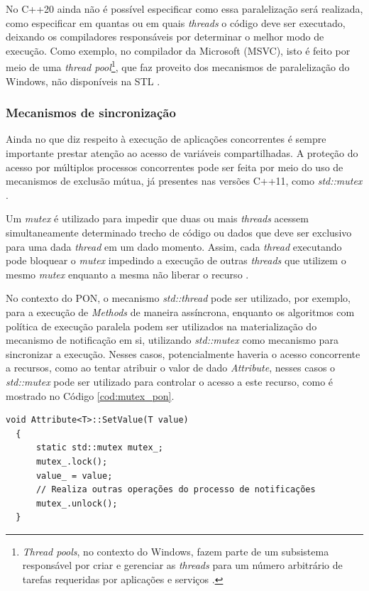 No C++20 ainda não é possível especificar como essa paralelização será
realizada, como especificar em quantas ou em quais \textit{threads} o código
deve ser executado, deixando os compiladores responsáveis por determinar o
melhor modo de execução. Como exemplo, no compilador da Microsoft (MSVC), isto é
feito por meio de uma \textit{thread pool}\footnote{\textit{Thread pools}, no
contexto do Windows, fazem parte de um subsistema responsável por criar e
gerenciar as \textit{threads} para um número arbitrário de tarefas requeridas
por aplicações e serviços \cite{teixeira_2012}.}, que faz proveito dos
mecanismos de paralelização do Windows, não disponíveis na STL
\cite{oneal_2018}.

\subsubsection{Mecanismos de sincronização}

Ainda no que diz respeito à execução de aplicações concorrentes é sempre
importante prestar atenção ao acesso de variáveis compartilhadas. A proteção do
acesso por múltiplos processos concorrentes pode ser feita por meio do uso de
mecanismos de exclusão mútua, já presentes nas versões C++11, como
\textit{std::mutex} \cite{boccara_2019}.

Um \textit{mutex} é utilizado para impedir que duas ou mais \textit{threads}
acessem simultaneamente determinado trecho de código ou dados que deve ser
exclusivo para uma dada \textit{thread} em um dado momento. Assim, cada
\textit{thread} executando pode bloquear o \textit{mutex} impedindo a execução
de outras \textit{threads} que utilizem o mesmo \textit{mutex} enquanto a mesma
não liberar o recurso \cite{boccara_2019}.

No contexto do PON, o mecanismo \textit{std::thread} pode ser utilizado, por
exemplo, para a execução de \textit{Methods} de maneira assíncrona, enquanto os
algoritmos com política de execução paralela podem ser utilizados na
materialização do mecanismo de notificação em si, utilizando \textit{std::mutex}
como mecanismo para sincronizar a execução. Nesses casos, potencialmente haveria
o acesso concorrente a recursos, como ao tentar atribuir o valor de dado
\textit{Attribute}, nesses casos o \textit{std::mutex} pode ser utilizado para
controlar o acesso a este recurso, como é mostrado no Código
\ref{cod:mutex_pon}. 

\begin{lstlisting}[caption = {Uso de \textit{mutex} nos \textit{Attributes}},
  source = {Autoria própria}, float=htb,
  label = {cod:mutex_pon}]
  void Attribute<T>::SetValue(T value)
  {
      static std::mutex mutex_;
      mutex_.lock();
      value_ = value;
      // Realiza outras operações do processo de notificações
      mutex_.unlock();
  }
\end{lstlisting}

